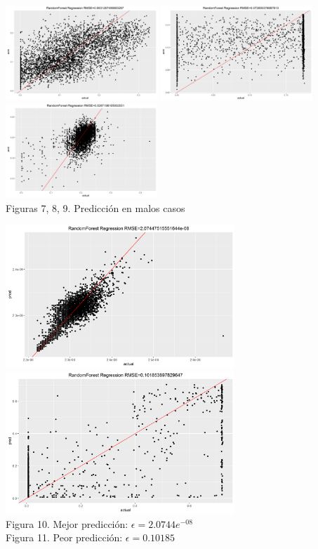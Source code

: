 \documentclass[../Main.tex]{subfiles}
\begin{document}
\begin{center}
\includegraphics[width=2.25in]{Assets/Predict_19_.png}
\includegraphics[width=2.25in]{Assets/Predict_23_.png}
\includegraphics[width=2.25in]{Assets/Predict_9_.png}
\\Figuras 7, 8, 9. Predicción en malos casos
\end{center}

\begin{center}
\includegraphics[width=3.4in]{Assets/Predict_17_.png}
\includegraphics[width=3.4in]{Assets/Predict_32_.png}
\\Figura 10. Mejor predicción: $\epsilon=2.0744e^{-08}$
\\Figura 11. Peor predicción: $\epsilon=0.10185$
\end{center}
\end{document}
